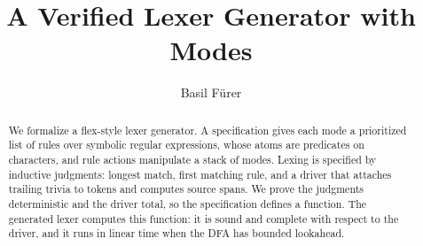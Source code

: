 \documentclass[11pt,a4paper]{article}
\begin{document}
\title{A Verified Lexer Generator with Modes}
\author{Basil F\"urer}
\maketitle

\begin{abstract}
  We formalize a flex-style lexer generator. A specification gives each mode a
  prioritized list of rules over symbolic regular expressions, whose atoms are
  predicates on characters, and rule actions manipulate a stack of modes.
  Lexing is specified by inductive judgments: longest match, first matching rule,
  and a driver that attaches trailing trivia to tokens and computes source spans.
  We prove the judgments deterministic and the driver total, so the specification
  defines a function. The generated lexer computes this function: it is sound and
  complete with respect to the driver, and it runs in linear time when the DFA has
  bounded lookahead.
\end{abstract}

\tableofcontents





\end{document}
